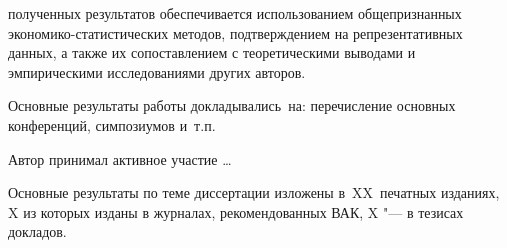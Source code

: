 {\reliability} полученных результатов обеспечивается использованием общепризнанных экономико-статистических методов, подтверждением на репрезентативных данных, а также их сопоставлением с теоретическими выводами и эмпирическими исследованиями других авторов.


{\probation}
Основные результаты работы докладывались~на:
перечисление основных конференций, симпозиумов и~т.\:п.

{\contribution} Автор принимал активное участие \ldots

{%
    {\publications} Основные результаты по теме диссертации изложены
    в~XX~печатных изданиях,
    X из которых изданы в журналах, рекомендованных ВАК,
    X "--- в тезисах докладов.
}%

